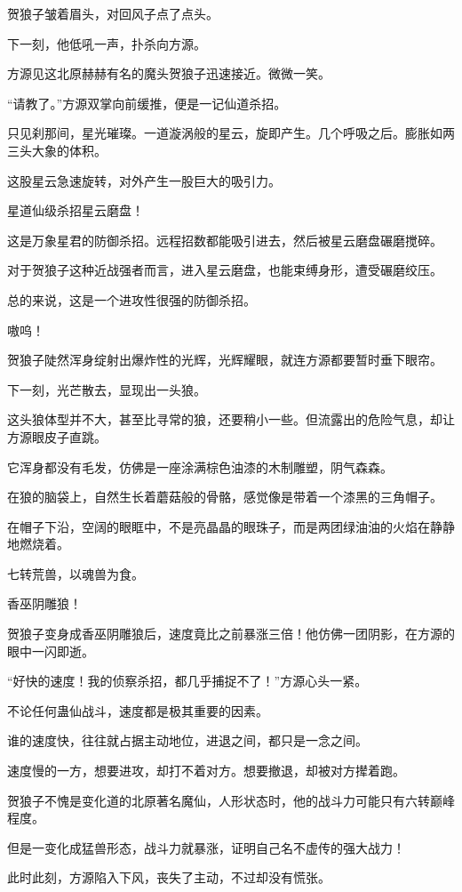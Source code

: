 \begin{this_body}
贺狼子皱着眉头，对回风子点了点头。

下一刻，他低吼一声，扑杀向方源。

方源见这北原赫赫有名的魔头贺狼子迅速接近。微微一笑。

“请教了。”方源双掌向前缓推，便是一记仙道杀招。

只见刹那间，星光璀璨。一道漩涡般的星云，旋即产生。几个呼吸之后。膨胀如两三头大象的体积。

这股星云急速旋转，对外产生一股巨大的吸引力。

星道仙级杀招星云磨盘！

这是万象星君的防御杀招。远程招数都能吸引进去，然后被星云磨盘碾磨搅碎。

对于贺狼子这种近战强者而言，进入星云磨盘，也能束缚身形，遭受碾磨绞压。

总的来说，这是一个进攻性很强的防御杀招。

嗷呜！

贺狼子陡然浑身绽射出爆炸性的光辉，光辉耀眼，就连方源都要暂时垂下眼帘。

下一刻，光芒散去，显现出一头狼。

这头狼体型并不大，甚至比寻常的狼，还要稍小一些。但流露出的危险气息，却让方源眼皮子直跳。

它浑身都没有毛发，仿佛是一座涂满棕色油漆的木制雕塑，阴气森森。

在狼的脑袋上，自然生长着蘑菇般的骨骼，感觉像是带着一个漆黑的三角帽子。

在帽子下沿，空阔的眼眶中，不是亮晶晶的眼珠子，而是两团绿油油的火焰在静静地燃烧着。

七转荒兽，以魂兽为食。

香巫阴雕狼！

贺狼子变身成香巫阴雕狼后，速度竟比之前暴涨三倍！他仿佛一团阴影，在方源的眼中一闪即逝。

“好快的速度！我的侦察杀招，都几乎捕捉不了！”方源心头一紧。

不论任何蛊仙战斗，速度都是极其重要的因素。

谁的速度快，往往就占据主动地位，进退之间，都只是一念之间。

速度慢的一方，想要进攻，却打不着对方。想要撤退，却被对方撵着跑。

贺狼子不愧是变化道的北原著名魔仙，人形状态时，他的战斗力可能只有六转巅峰程度。

但是一变化成猛兽形态，战斗力就暴涨，证明自己名不虚传的强大战力！

此时此刻，方源陷入下风，丧失了主动，不过却没有慌张。


\end{this_body}

